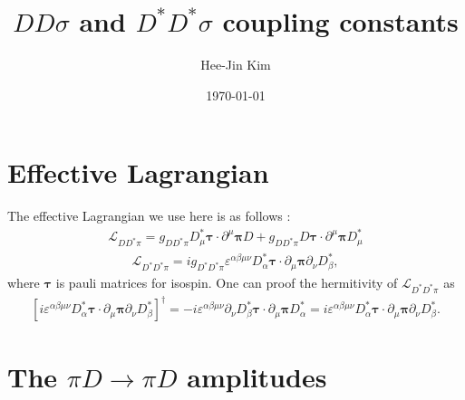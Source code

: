 \documentclass[aps,prd,preprintnumbers,showpacs,showkeys,nofootinbib,
superscriptaddress,fleqn,floatfix,tightenlines, 10pt]{revtex4-1}
\begin{document}
\title{$DD\sigma$ and $D^* D^* \sigma$ coupling constants}
\author{Hee-Jin Kim}
\date{\today}
\maketitle


\section{Effective Lagrangian}
 The effective Lagrangian we use here is as follows :
\begin{align} \label{Lagrangian}
	\mathcal{L}_{D D^* \pi} = g_{D D^* \pi} D^*_\mu \bm{\tau} \cdot \partial^\mu \bm{\pi} D
	+ g_{D D^* \pi} D \bm{\tau} \cdot \partial^\mu \bm{\pi} D^*_\mu
\end{align}
\begin{align} \label{Lagrangian_D*}
	\mathcal{L}_{D^* D^* \pi} = i g_{D^* D^* \pi} \varepsilon^{\alpha\beta\mu\nu} D^*_\alpha \bm{\tau} \cdot \partial_\mu \bm{\pi}
	\partial _\nu D^*_\beta,
\end{align}
where $\bm{\tau}$ is pauli matrices for isospin. One can proof the hermitivity of $\mathcal{L}_{D^* D^* \pi}$ as
\begin{align}\label{hermitivity_D*}
	\left[i \varepsilon^{\alpha \beta \mu \nu} D_{\alpha}^\ast \bm{\tau} \cdot \partial_\mu \bm{\pi} \partial_\nu D_{\beta}^\ast \right]^\dagger
	= -i \varepsilon^{\alpha \beta \mu \nu} \partial_\nu D_{\beta}^\ast \bm{\tau} \cdot \partial_\mu \bm{\pi} D_{\alpha}^\ast
	= i \varepsilon^{\alpha \beta \mu \nu} D_{\alpha}^\ast \bm{\tau} \cdot \partial_\mu \bm{\pi} \partial_\nu D_{\beta}^\ast.
\end{align}

\section{The $\pi D \rightarrow \pi D$ amplitudes}
\end{document}
